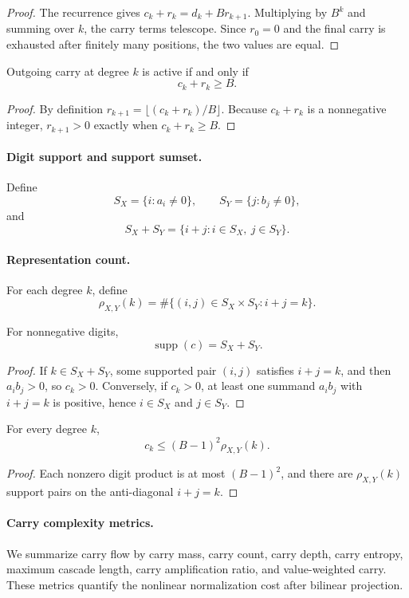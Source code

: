\begin{proof}
The recurrence gives \(c_k+r_k=d_k+B r_{k+1}\). Multiplying by \(B^k\) and
summing over \(k\), the carry terms telescope. Since \(r_0=0\) and the final
carry is exhausted after finitely many positions, the two values are equal.
\end{proof}

\begin{proposition}
Outgoing carry at degree \(k\) is active if and only if
\[
    c_k+r_k\ge B.
\]
\end{proposition}

\begin{proof}
By definition \(r_{k+1}=\lfloor(c_k+r_k)/B\rfloor\). Because \(c_k+r_k\) is a
nonnegative integer, \(r_{k+1}>0\) exactly when \(c_k+r_k\ge B\).
\end{proof}

\paragraph{Digit support and support sumset.}
Define
\[
    S_X=\{i:a_i\ne 0\},\qquad S_Y=\{j:b_j\ne 0\},
\]
and
\[
    S_X+S_Y=\{i+j:i\in S_X,\ j\in S_Y\}.
\]

\paragraph{Representation count.}
For each degree \(k\), define
\[
    \rho_{X,Y}(k)=\#\{(i,j)\in S_X\times S_Y:i+j=k\}.
\]

\begin{proposition}
For nonnegative digits,
\[
    \operatorname{supp}(c)=S_X+S_Y.
\]
\end{proposition}

\begin{proof}
If \(k\in S_X+S_Y\), some supported pair \((i,j)\) satisfies \(i+j=k\), and
then \(a_i b_j>0\), so \(c_k>0\). Conversely, if \(c_k>0\), at least one
summand \(a_i b_j\) with \(i+j=k\) is positive, hence \(i\in S_X\) and
\(j\in S_Y\).
\end{proof}

\begin{proposition}
For every degree \(k\),
\[
    c_k\le (B-1)^2\rho_{X,Y}(k).
\]
\end{proposition}

\begin{proof}
Each nonzero digit product is at most \((B-1)^2\), and there are
\(\rho_{X,Y}(k)\) support pairs on the anti-diagonal \(i+j=k\).
\end{proof}

\paragraph{Carry complexity metrics.}
We summarize carry flow by carry mass, carry count, carry depth, carry entropy,
maximum cascade length, carry amplification ratio, and value-weighted carry.
These metrics quantify the nonlinear normalization cost after bilinear
projection.
